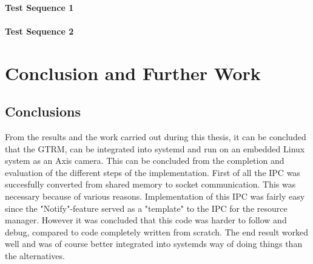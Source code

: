 \documentclass[nobiblatex]{LTHthesis}
\begin{document}

\subsubsection{Test Sequence 1}


\subsubsection{Test Sequence 2}


\chapter{Conclusion and Further Work}
\label{chp:conclusion}

\section{Conclusions}
From the results and the work carried out during this thesis, it can be concluded that the GTRM, can be integrated into systemd and run on an embedded Linux system as an Axis camera. This can be concluded from the completion and evaluation of the different steps of the implementation. First of all the IPC was succesfully converted from shared memory to socket communication. This was necessary because of various reasons. Implementation of this IPC was fairly easy since the "Notify"-feature served as a "template" to the IPC for the resource manager. However it was concluded that this code was harder to follow and debug, compared to code completely written from scratch. The end result worked well and was of course better integrated into systemds way of doing things than the alternatives.
\end{document}
